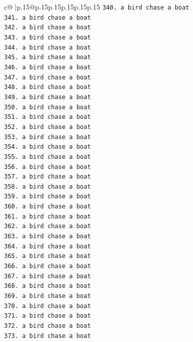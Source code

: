\documentclass{article}
\begin{document}
{\begin{supertabular}{c@{$\;$}|p{.15\linewidth}@{}p{.15\linewidth}p{.15\linewidth}p{.15\linewidth}p{.15\linewidth}p{.15\linewidth}}
{{{\texttt{340. a bird chase a boat} \\
\texttt{341. a bird chase a boat} \\
\texttt{342. a bird chase a boat} \\
\texttt{343. a bird chase a boat} \\
\texttt{344. a bird chase a boat} \\
\texttt{345. a bird chase a boat} \\
\texttt{346. a bird chase a boat} \\
\texttt{347. a bird chase a boat} \\
\texttt{348. a bird chase a boat} \\
\texttt{349. a bird chase a boat} \\
\texttt{350. a bird chase a boat} \\
\texttt{351. a bird chase a boat} \\
\texttt{352. a bird chase a boat} \\
\texttt{353. a bird chase a boat} \\
\texttt{354. a bird chase a boat} \\
\texttt{355. a bird chase a boat} \\
\texttt{356. a bird chase a boat} \\
\texttt{357. a bird chase a boat} \\
\texttt{358. a bird chase a boat} \\
\texttt{359. a bird chase a boat} \\
\texttt{360. a bird chase a boat} \\
\texttt{361. a bird chase a boat} \\
\texttt{362. a bird chase a boat} \\
\texttt{363. a bird chase a boat} \\
\texttt{364. a bird chase a boat} \\
\texttt{365. a bird chase a boat} \\
\texttt{366. a bird chase a boat} \\
\texttt{367. a bird chase a boat} \\
\texttt{368. a bird chase a boat} \\
\texttt{369. a bird chase a boat} \\
\texttt{370. a bird chase a boat} \\
\texttt{371. a bird chase a boat} \\
\texttt{372. a bird chase a boat} \\
\texttt{373. a bird chase a boat} \\
}}}
\end{supertabular}}
\end{document}
